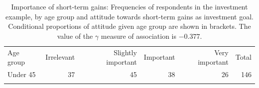 \documentclass[11pt,a4paper,openany]{book}
\begin{document}
\begin{longtable}[]{@{}lrrrrr@{}}
\caption{\label{tab:t-investors} Importance of short-term gains: Frequencies
of respondents in the investment example, by age group and attitude
towards short-term gains as investment goal. Conditional proportions of
attitude given age group are shown in brackets. The value of the
\(\gamma\) measure of association is \(-0.377\).}\tabularnewline
\toprule
\begin{minipage}[t]{0.10\columnwidth}\raggedright\strut
Age group\strut
\end{minipage} & \begin{minipage}[t]{0.40\columnwidth}\raggedleft\strut
Irrelevant\strut
\end{minipage} & \begin{minipage}[t]{0.09\columnwidth}\raggedleft\strut
Slightly important\strut
\end{minipage} & \begin{minipage}[t]{0.09\columnwidth}\raggedleft\strut
Important\strut
\end{minipage} & \begin{minipage}[t]{0.09\columnwidth}\raggedleft\strut
Very important\strut
\end{minipage} & \begin{minipage}[t]{0.06\columnwidth}\raggedleft\strut
Total\strut
\end{minipage}\tabularnewline
\begin{minipage}[t]{0.10\columnwidth}\raggedright\strut
Under 45\strut
\end{minipage} & \begin{minipage}[t]{0.40\columnwidth}\raggedleft\strut
37\strut
\end{minipage} & \begin{minipage}[t]{0.09\columnwidth}\raggedleft\strut
45\strut
\end{minipage} & \begin{minipage}[t]{0.09\columnwidth}\raggedleft\strut
38\strut
\end{minipage} & \begin{minipage}[t]{0.09\columnwidth}\raggedleft\strut
26\strut
\end{minipage} & \begin{minipage}[t]{0.06\columnwidth}\raggedleft\strut
146\strut
\end{minipage}\tabularnewline
\begin{minipage}[t]{0.10\columnwidth}\raggedright\strut
\strut
\end{minipage} & \begin{minipage}[t]{0.40\columnwidth}\raggedleft\strut

\end{minipage}
\end{longtable}
\end{document}
